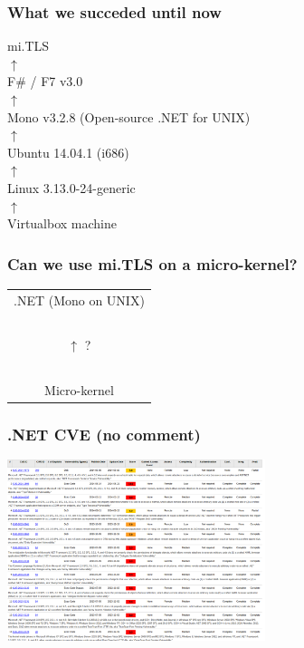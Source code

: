 \documentclass{beamer}
\begin{document}
\begin{frame}
    \frametitle{What we succeded until now}

    \begin{table}
        mi.TLS\\
        $\uparrow$\\
        F\# / F7 v3.0\\
        $\uparrow$\\
        Mono v3.2.8 (Open-source .NET for UNIX)\\
        $\uparrow$\\
        Ubuntu 14.04.1 (i686)\\
        $\uparrow$\\
        Linux 3.13.0-24-generic\\
        $\uparrow$\\
        Virtualbox machine\\
    \end{table}
\end{frame}

\begin{frame}
    \frametitle{Can we use mi.TLS on a micro-kernel?}
    
    \begin{table}
        \begin{tabular}{c}
            .NET (Mono on UNIX)\\
            ~\\
            {\Huge $\uparrow$ ?}\\
            ~\\
            Micro-kernel\\
        \end{tabular}
    \end{table}
    
\end{frame}

\begin{frame}
\frametitle{.NET CVE (no comment)}

\includegraphics[height=200px]{dotnet_cve.png}

\end{frame}
\end{document}
